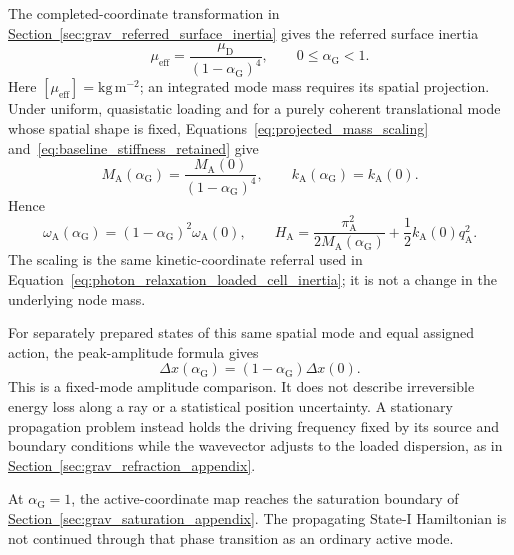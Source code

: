 The completed-coordinate transformation in \hyperref[sec:grav_referred_surface_inertia]{Section~\ref*{sec:grav_referred_surface_inertia}} gives the referred surface inertia
\begin{equation}
    \mu_{\mathrm{eff}}
    =\frac{\mu_{\mathrm D}}{(1-\alpha_{\mathrm G})^4},
    \qquad 0\leq\alpha_{\mathrm G}<1.
\end{equation}
Here $[\mu_{\mathrm{eff}}]=\mathrm{kg\,m^{-2}}$; an integrated mode mass requires its spatial projection. Under uniform, quasistatic loading and for a purely coherent translational mode whose spatial shape is fixed, Equations~\eqref{eq:projected_mass_scaling} and~\eqref{eq:baseline_stiffness_retained} give
\begin{equation}
    M_{\mathrm A}(\alpha_{\mathrm G})
    =\frac{M_{\mathrm A}(0)}{(1-\alpha_{\mathrm G})^4},
    \qquad
    k_{\mathrm A}(\alpha_{\mathrm G})=k_{\mathrm A}(0).
\end{equation}
Hence
\begin{equation}
    \omega_{\mathrm A}(\alpha_{\mathrm G})
    =(1-\alpha_{\mathrm G})^2\omega_{\mathrm A}(0),
    \qquad
    H_{\mathrm A}
    =\frac{\pi_{\mathrm A}^{2}}{2M_{\mathrm A}(\alpha_{\mathrm G})}
    +\frac12k_{\mathrm A}(0)q_{\mathrm A}^{2}.
\end{equation}
The scaling is the same kinetic-coordinate referral used in Equation~\eqref{eq:photon_relaxation_loaded_cell_inertia}; it is not a change in the underlying node mass.

For separately prepared states of this same spatial mode and equal assigned action, the peak-amplitude formula gives
\begin{equation}
    \Delta x(\alpha_{\mathrm G})
    =(1-\alpha_{\mathrm G})\Delta x(0).
\end{equation}
This is a fixed-mode amplitude comparison. It does not describe irreversible energy loss along a ray or a statistical position uncertainty. A stationary propagation problem instead holds the driving frequency fixed by its source and boundary conditions while the wavevector adjusts to the loaded dispersion, as in \hyperref[sec:grav_refraction_appendix]{Section~\ref*{sec:grav_refraction_appendix}}.

At $\alpha_{\mathrm G}=1$, the active-coordinate map reaches the saturation boundary of \hyperref[sec:grav_saturation_appendix]{Section~\ref*{sec:grav_saturation_appendix}}. The propagating State-I Hamiltonian is not continued through that phase transition as an ordinary active mode.

